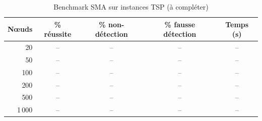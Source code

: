 \documentclass[12pt,a4paper]{report}
\begin{document}
\begin{table}[h]
	\centering
	\begin{tabular}{@{}rcccc@{}}
		\toprule
		\textbf{Nœuds} & \textbf{\% réussite} & \textbf{\% non-détection}
					& \textbf{\% fausse détection} & \textbf{Temps (s)} \\
		\midrule
		20         & -- & -- & -- & -- \\
		50         & -- & -- & -- & -- \\
		100        & -- & -- & -- & -- \\
		200        & -- & -- & -- & -- \\
		500        & -- & -- & -- & -- \\
		1\,000     & -- & -- & -- & -- \\
		\bottomrule
	\end{tabular}
	\caption{Benchmark SMA sur instances TSP (à compléter)}
\end{table}
\end{document}
